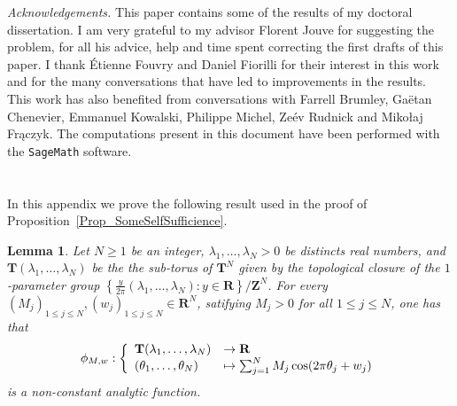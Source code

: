 \documentclass[a4paper,10pt]{amsart}
\theoremstyle{plain}
\newtheorem{lem}[theo]{Lemma}
\theoremstyle{definition}
\begin{document}
\noindent\emph{Acknowledgements.}
This paper contains some of the results of my doctoral dissertation.
I am very grateful to my advisor Florent Jouve for suggesting the problem, for all his advice, help and time spent correcting the first drafts of this paper.
I thank \'{E}tienne Fouvry and Daniel Fiorilli for their interest in this work and for the many conversations that have led to improvements in the results.
This work has also benefited from conversations with Farrell Brumley, Ga{\"e}tan Chenevier, Emmanuel Kowalski, Philippe Michel, Ze{\'e}v Rudnick and Miko\l{}aj Fr\k{a}czyk.
The computations present in this document have been performed with the \texttt{SageMath} \cite{sagemath} software.

 


\appendix
\section{}\label{App_proofNonConst}

In this appendix we prove the following result used in the proof of Proposition~\ref{Prop_SomeSelfSufficience}.
\begin{lem}
Let $N\geq 1$ be an integer, $\lambda_{1},\ldots,\lambda_{N} >0$ be distincts real numbers,
and $\mathbf{T}(\lambda_{1},\ldots,\lambda_{N})$ be the the sub-torus of $\mathbf{T}^{N}$ given by
the topological closure of the $1$-parameter group 
$\left\lbrace \frac{y}{2\pi} \left(\lambda_{1},\ldots,\lambda_{N}\right) : y\in\mathbf{R} \right\rbrace/\mathbf{Z}^{N}$.
For every $(M_{j})_{1\leq j\leq N}, (w_{j})_{1\leq j\leq N} \in \mathbf{R}^{N}$, satifying $M_{j} > 0$ for all $1\leq j\leq N$,
one has that
$$\phi_{M,w} : \left\lbrace
\begin{array}{l l}
\mathbf{T}(\lambda_{1},\ldots,\lambda_{N}) & \rightarrow \mathbf{R} \\
(\theta_{1},\ldots,\theta_{N}) &\mapsto \sum_{j=1}^{N}M_{j}\cos(2\pi \theta_{j} + w_{j})
\end{array}
\right.$$
is a non-constant analytic function.
\end{lem}
\end{document}
